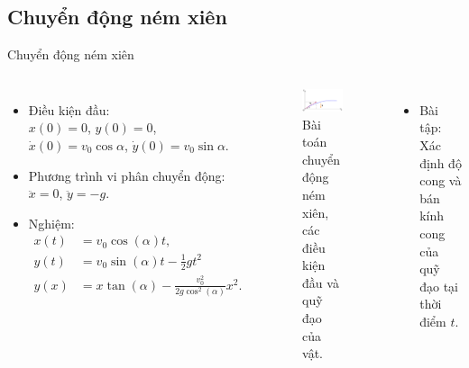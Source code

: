 \subsection{Chuyển động ném xiên}

\begin{frame}{Chuyển động ném xiên}
    \begin{columns}
        \vspace{-3mm}
            \begin{itemize}
                \item Điều kiện đầu: \\
                \(x(0)=0\), \(y(0)=0\), \(\dot{x}(0)= v_0 \cos \alpha\), \(\dot{y}(0)= v_0 \sin \alpha\).
                \item Phương trình vi phân chuyển động: \(\ddot{x} = 0\), \(\ddot{y} = -g\).
                \item Nghiệm:
                \begin{align}
                    x(t) &= v_0 \cos \left( \alpha \right) t, \\
                    y(t) &= v_0 \sin \left( \alpha \right) t - \frac{1}{2} g t^2 \\
                    y(x) &= x \tan \left( \alpha \right) - \frac{v_0^2}{2g \cos^2 \left( \alpha \right)}x^2. 
                \end{align}
            \end{itemize}            
            \vspace{-2mm}
            \begin{figure}
                \centering
                \includegraphics[width=0.9\linewidth]{Figures/Projectile_motion.pdf}
                \caption{Bài toán chuyển động ném xiên, các điều kiện đầu và quỹ đạo của vật.}
                \label{fig:Projectile_motion}
            \end{figure}
            \vspace{-5mm}
            \begin{itemize}
                \item Bài tập: Xác định độ cong và bán kính cong của quỹ đạo tại thời điểm \(t\).
            \end{itemize}
    \end{columns}
\end{frame}

